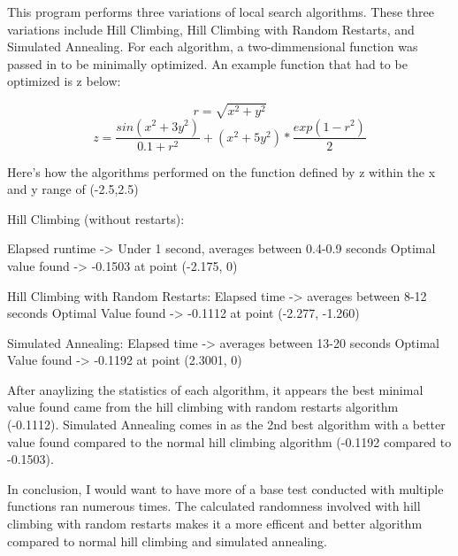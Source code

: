 \documentclass[a4paper,12pt]{article}
\begin{document}
This program performs three variations of local search algorithms. These three variations include Hill Climbing, Hill Climbing with Random Restarts, and Simulated Annealing. For each algorithm, a two-dimmensional function was passed in to be minimally optimized. An example function that had to be optimized is z below:

\[r = \sqrt{x^2 + y^2} \]
\[z = \frac{sin(x^2 + 3y^2)}{0.1 + r^2} + (x^2 + 5y^2) * \frac{exp(1-r^2)}{2} \]

Here's how the algorithms performed on the function defined by z within the x and y range of (-2.5,2.5)

Hill Climbing (without restarts):

Elapsed runtime -> Under 1 second, averages between 0.4-0.9 seconds
Optimal value found -> -0.1503 at point (-2.175, 0)

Hill Climbing with Random Restarts:
Elapsed time -> averages between 8-12 seconds
Optimal Value found -> -0.1112 at point (-2.277, -1.260)

Simulated Annealing:
Elapsed time -> averages between 13-20 seconds
Optimal Value found -> -0.1192 at point (2.3001, 0)

After anaylizing the statistics of each algorithm, it appears the best minimal value found came from the hill climbing with random restarts algorithm (-0.1112). Simulated Annealing comes in as the 2nd best algorithm with a better value found compared to the normal hill climbing algorithm (-0.1192 compared to -0.1503).

In conclusion, I would want to have more of a base test conducted with multiple functions ran numerous times. The calculated randomness involved with hill climbing with random restarts makes it a more efficent and better algorithm compared to normal hill climbing and simulated annealing.
\end{document}
